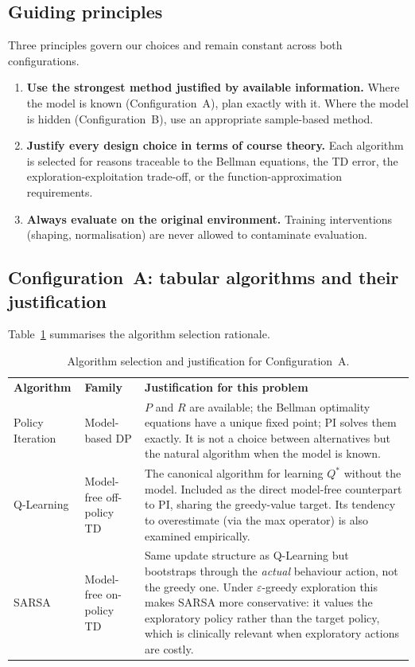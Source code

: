 \documentclass[11pt,a4paper]{article}
\newcommand{\tH}[1]{\textcolor{novagreen}{\textbf{#1}}}
\newcommand{\gmid}{\arrayrulecolor{novagreen}\midrule\arrayrulecolor{black}}
\begin{document}
\subsection{Guiding principles}

Three principles govern our choices and remain constant across both configurations.

\begin{enumerate}
\item \textbf{Use the strongest method justified by available information.} Where
the model is known (Configuration~A), plan exactly with it. Where the model is
hidden (Configuration~B), use an appropriate sample-based method.
\item \textbf{Justify every design choice in terms of course theory.} Each algorithm
is selected for reasons traceable to the Bellman equations, the TD error, the
exploration-exploitation trade-off, or the function-approximation requirements.
\item \textbf{Always evaluate on the original environment.} Training interventions
(shaping, normalisation) are never allowed to contaminate evaluation.
\end{enumerate}

\subsection{Configuration~A: tabular algorithms and their justification}
\label{sec:methA}

Table~\ref{tab:algojust_a} summarises the algorithm selection rationale.

\begin{table}[H]
\centering
\begin{tabularx}{\textwidth}{>{\raggedright\arraybackslash}p{}
                             >{\raggedright\arraybackslash}p{}X}
\toprule
\tH{Algorithm} & \tH{Family} & \tH{Justification for this problem} \\
\gmid
Policy Iteration & Model-based DP &
  $P$ and $R$ are available; the Bellman optimality equations have a unique
  fixed point; PI solves them exactly. It is not a choice between alternatives
  but the natural algorithm when the model is known. \\
Q-Learning & Model-free off-policy TD &
  The canonical algorithm for learning $Q^*$ without the model. Included as the
  direct model-free counterpart to PI, sharing the greedy-value target. Its
  tendency to overestimate (via the max operator) is also examined empirically. \\
SARSA & Model-free on-policy TD &
  Same update structure as Q-Learning but bootstraps through the \emph{actual}
  behaviour action, not the greedy one. Under $\varepsilon$-greedy exploration this
  makes SARSA more conservative: it values the exploratory policy rather than the
  target policy, which is clinically relevant when exploratory actions are costly. \\
\bottomrule
\end{tabularx}
\caption{Algorithm selection and justification for Configuration~A.}
\label{tab:algojust_a}
\end{table}
\end{document}

